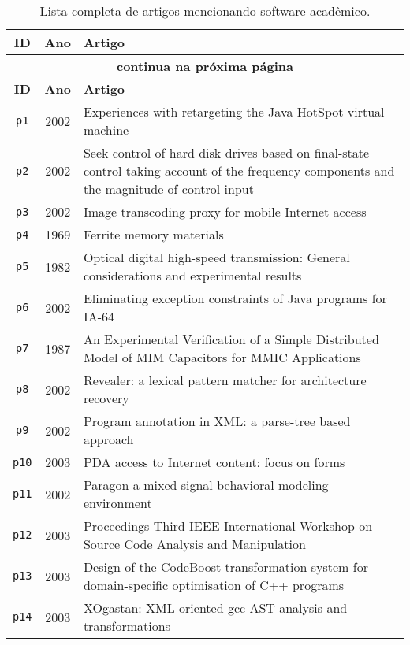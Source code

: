 \begin{longtable}{| c | c | p{16cm} |}
  \caption{Lista completa de artigos mencionando software acadêmico.}
  \label{references-full-list} \\
  \hline
  \endfirsthead
  \hline
  \textbf{ID} & \textbf{Ano} & \textbf{Artigo} \\
  \hline
  \endhead
  \multicolumn{3}{c}{\textbf{continua na próxima página}} \\
  \hhline{---} \endfoot
  \endlastfoot
  \textbf{ID} & \textbf{Ano} & \textbf{Artigo} \\
  \hline
  \texttt{p1} & 2002 & Experiences with retargeting the Java HotSpot virtual machine \\
  \hline
  \texttt{p2} & 2002 & Seek control of hard disk drives based on final-state control taking account of the frequency components and the magnitude of control input \\
  \hline
  \texttt{p3} & 2002 & Image transcoding proxy for mobile Internet access \\
  \hline
  \texttt{p4} & 1969 & Ferrite memory materials \\
  \hline
  \texttt{p5} & 1982 & Optical digital high-speed transmission: General considerations and experimental results \\
  \hline
  \texttt{p6} & 2002 & Eliminating exception constraints of Java programs for IA-64 \\
  \hline
  \texttt{p7} & 1987 & An Experimental Verification of a Simple Distributed Model of MIM Capacitors for MMIC Applications \\
  \hline
  \texttt{p8} & 2002 & Revealer: a lexical pattern matcher for architecture recovery \\
  \hline
  \texttt{p9} & 2002 & Program annotation in XML: a parse-tree based approach \\
  \hline
  \texttt{p10} & 2003 & PDA access to Internet content: focus on forms \\
  \hline
  \texttt{p11} & 2002 & Paragon-a mixed-signal behavioral modeling environment \\
  \hline
  \texttt{p12} & 2003 & Proceedings Third IEEE International Workshop on Source Code Analysis and Manipulation \\
  \hline
  \texttt{p13} & 2003 & Design of the CodeBoost transformation system for domain-specific optimisation of C++ programs \\
  \hline
  \texttt{p14} & 2003 & XOgastan: XML-oriented gcc AST analysis and transformations \\

\end{longtable}
